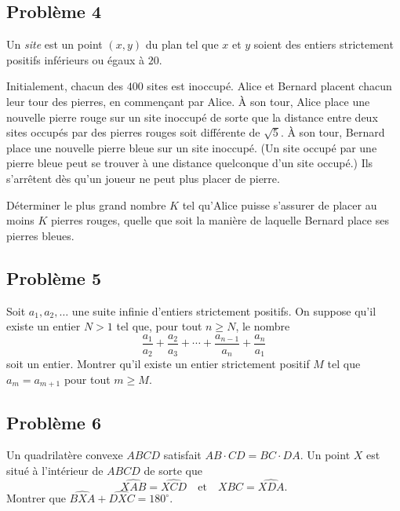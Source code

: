 \subsection*{Problème 4}
Un \emph{site} est un point $(x, y)$ du plan tel que $x$ et $y$ soient des entiers strictement positifs
inférieurs ou égaux à $20$.

Initialement, chacun des $400$ sites est inoccupé. Alice et Bernard placent chacun leur tour des pierres, en
commençant par Alice. À son tour, Alice place une nouvelle pierre rouge sur un site inoccupé de sorte que la
distance entre deux sites occupés par des pierres rouges soit différente de $\sqrt{5}$. À son tour, Bernard
place une nouvelle pierre bleue sur un site inoccupé. (Un site occupé par une pierre bleue peut se trouver à
une distance quelconque d'un site occupé.) Ils s'arrêtent dès qu'un joueur ne peut plus placer de pierre.

Déterminer le plus grand nombre $K$ tel qu'Alice puisse s'assurer de placer au moins $K$ pierres rouges,
quelle que soit la manière de laquelle Bernard place ses pierres bleues.

\subsection*{Problème 5}
Soit $a_1, a_2, \ldots$ une suite infinie d'entiers strictement positifs. On suppose qu'il existe un entier
$N > 1$ tel que, pour tout $n \geqslant N$, le nombre
\[
\frac{a_1}{a_2} + \frac{a_2}{a_3} + \cdots + \frac{a_{n-1}}{a_n} + \frac{a_n}{a_1}
\]
soit un entier. Montrer qu'il existe un entier strictement positif $M$ tel que $a_m = a_{m+1}$ pour tout
$m \geqslant M$.

\subsection*{Problème 6}
Un quadrilatère convexe $ABCD$ satisfait $AB \cdot CD = BC \cdot DA$. Un point $X$ est situé à l'intérieur de
$ABCD$ de sorte que
\[
\widehat{XAB} = \widehat{XCD} \quad \text{et} \quad \widehat{XBC} = \widehat{XDA}.
\]
Montrer que $\widehat{BXA} + \widehat{DXC} = 180^\circ$.
